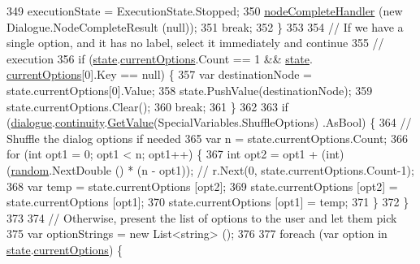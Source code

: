 \begin{DoxyCode}
349                     executionState = ExecutionState.Stopped;
350                     \hyperlink{a00138_a5129c63e67e2d4e2780d86b8351320a2}{nodeCompleteHandler} (\textcolor{keyword}{new} Dialogue.NodeCompleteResult (null));
351                     \textcolor{keywordflow}{break};
352                 \}
353 
354                 \textcolor{comment}{// If we have a single option, and it has no label, select it immediately and continue}
355                 \textcolor{comment}{// execution}
356                 \textcolor{keywordflow}{if} (\hyperlink{a00138_a70f2ce6201cdd2430ceaa764ac614ca0}{state}.\hyperlink{a00141_ab816dfea32ecda23282700f01454e0a9}{currentOptions}.Count == 1 && \hyperlink{a00138_a70f2ce6201cdd2430ceaa764ac614ca0}{state}.
      \hyperlink{a00141_ab816dfea32ecda23282700f01454e0a9}{currentOptions}[0].Key == null) \{
357                     var destinationNode = state.currentOptions[0].Value;
358                     state.PushValue(destinationNode);
359                     state.currentOptions.Clear();
360                     \textcolor{keywordflow}{break};
361                 \}
362 
363                 \textcolor{keywordflow}{if} (\hyperlink{a00138_ac506426c503da5f033247c29e11c5e82}{dialogue}.\hyperlink{a00072_ae94eaa4b03b432422f5d205fabe37ff5}{continuity}.\hyperlink{a00166_accab1fc5c8fc353dbfc53ca0f4029576}{GetValue}(SpecialVariables.ShuffleOptions)
      .AsBool) \{
364                     \textcolor{comment}{// Shuffle the dialog options if needed}
365                     var n = state.currentOptions.Count;
366                     \textcolor{keywordflow}{for} (\textcolor{keywordtype}{int} opt1 = 0; opt1 < n; opt1++) \{
367                         \textcolor{keywordtype}{int} opt2 = opt1 + (int)(\hyperlink{a00138_a408485a00c7cc558428c86ed9dd04fca}{random}.NextDouble () * (n - opt1)); \textcolor{comment}{// r.Next(0,
       state.currentOptions.Count-1);}
368                         var temp = state.currentOptions [opt2];
369                         state.currentOptions [opt2] = state.currentOptions [opt1];
370                         state.currentOptions [opt1] = temp;
371                     \}
372                 \}
373 
374                 \textcolor{comment}{// Otherwise, present the list of options to the user and let them pick}
375                 var optionStrings = \textcolor{keyword}{new} List<string> ();
376 
377                 \textcolor{keywordflow}{foreach} (var option \textcolor{keywordflow}{in} \hyperlink{a00138_a70f2ce6201cdd2430ceaa764ac614ca0}{state}.\hyperlink{a00141_ab816dfea32ecda23282700f01454e0a9}{currentOptions}) \{

\end{DoxyCode}
